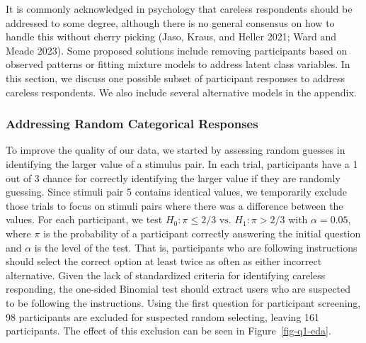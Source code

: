 \documentclass[
  letterpaper,
  DIV=11,
  numbers=noendperiod]{scrartcl}
\begin{document}
It is commonly acknowledged in psychology that careless respondents
should be addressed to some degree, although there is no general
consensus on how to handle this without cherry picking (Jaso, Kraus, and
Heller 2021; Ward and Meade 2023). Some proposed solutions include
removing participants based on observed patterns or fitting mixture
models to address latent class variables. In this section, we discuss
one possible subset of participant responses to address careless
respondents. We also include several alternative models in the appendix.

\subsubsection{Addressing Random Categorical
Responses}\label{sec-remove-random-categories}

To improve the quality of our data, we started by assessing random
guesses in identifying the larger value of a stimulus pair. In each
trial, participants have a 1 out of 3 chance for correctly identifying
the larger value if they are randomly guessing. Since stimuli pair 5
contains identical values, we temporarily exclude those trials to focus
on stimuli pairs where there was a difference between the values. For
each participant, we test \(H_0: \pi\leq2/3\text{ vs. }H_1:\pi>2/3\)
with \(\alpha=0.05\), where \(\pi\) is the probability of a participant
correctly answering the initial question and \(\alpha\) is the level of
the test. That is, participants who are following instructions should
select the correct option at least twice as often as either incorrect
alternative. Given the lack of standardized criteria for identifying
careless responding, the one-sided Binomial test should extract users
who are suspected to be following the instructions. Using the first
question for participant screening, 98 participants are excluded for
suspected random selecting, leaving 161 participants. The effect of this
exclusion can be seen in Figure~\ref{fig-q1-eda}.
\end{document}
